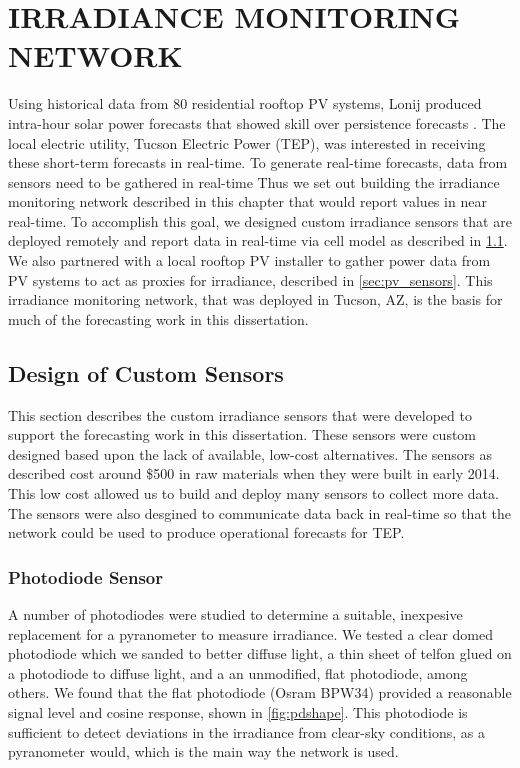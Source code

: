 \chapter{IRRADIANCE MONITORING NETWORK}
\label{chap:sens_net}

Using historical data from 80 residential rooftop PV systems, Lonij
\etal produced intra-hour solar power forecasts that showed skill over
persistence forecasts \citep{Lonij2013}.
The local electric utility, Tucson Electric Power (TEP), was interested in
receiving these short-term forecasts in real-time.
To generate real-time forecasts, data from sensors need to be gathered
in real-time
Thus we set out building the irradiance monitoring network described
in this chapter that would report values in near real-time.
To accomplish this goal, we designed custom irradiance sensors that
are deployed remotely and report data in real-time via cell model as
described in \cref{sec:custom_sensors}.
We also partnered with a local rooftop PV installer to gather power
data from PV systems to act as proxies for irradiance, described in
\cref{sec:pv_sensors}.
This irradiance monitoring network, that was deployed in Tucson, AZ, is
the basis for much of the forecasting work in this dissertation.


\section{Design of Custom Sensors}
\label{sec:custom_sensors}
This section describes the custom irradiance sensors that were
developed to support the forecasting work in this dissertation.
These sensors were custom designed based upon the lack of available,
low-cost alternatives.
The sensors as described cost around \$500 in raw materials when they
were built in early 2014.
This low cost allowed us to build and deploy many sensors to collect
more data.
The sensors were also desgined to communicate data back in real-time
so that the network could be used to produce operational forecasts for
TEP.

\subsection{Photodiode Sensor}
\label{sec:photodiode}
A number of photodiodes were studied to determine a suitable,
inexpesive replacement for a pyranometer to measure irradiance.
We tested a clear domed photodiode which we sanded to better diffuse
light, a thin sheet of telfon glued on a photodiode to diffuse light,
and a an unmodified, flat photodiode, among others.
We found that the flat photodiode (Osram BPW34) provided a reasonable
signal level and cosine response, shown in \cref{fig:pdshape}.
This photodiode is sufficient to detect deviations in the irradiance from
clear-sky conditions, as a pyranometer would, which is the main way
the network is used.


